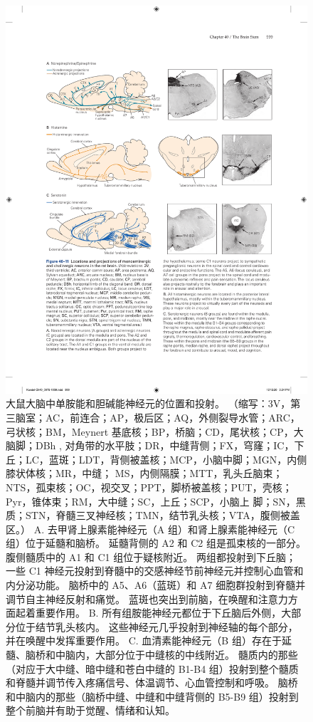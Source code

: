 \begin{figure}[htbp]
	\centering
	\includegraphics[width=0.95\linewidth]{chap40/fig_40_11}
	\caption{大鼠大脑中单胺能和胆碱能神经元的位置和投射。 （缩写：3V，第三脑室；AC，前连合；AP，极后区；AQ，外侧裂导水管；ARC，弓状核；BM，Meynert 基底核；BP，桥脑；CD，尾状核；CP，大脑脚；DBh , 对角带的水平肢；DR，中缝背侧；FX，穹窿；IC，下丘；LC，蓝斑；LDT，背侧被盖核；MCP，小脑中脚；MGN，内侧膝状体核；MR，中缝； MS，内侧隔膜；MTT，乳头丘脑束；NTS，孤束核；OC，视交叉；PPT，脚桥被盖核；PUT，壳核；Pyr，锥体束；RM，大中缝；SC，上丘；SCP，小脑上 脚；SN，黑质；STN，脊髓三叉神经核；TMN，结节乳头核；VTA，腹侧被盖区。） A. 去甲肾上腺素能神经元（A 组）和肾上腺素能神经元（C 组）位于延髓和脑桥。 延髓背侧的 A2 和 C2 组是孤束核的一部分。 腹侧髓质中的 A1 和 C1 组位于疑核附近。 两组都投射到下丘脑； 一些 C1 神经元投射到脊髓中的交感神经节前神经元并控制心血管和内分泌功能。 脑桥中的 A5、A6（蓝斑）和 A7 细胞群投射到脊髓并调节自主神经反射和痛觉。 蓝斑也突出到前脑，在唤醒和注意力方面起着重要作用。 B. 所有组胺能神经元都位于下丘脑后外侧，大部分位于结节乳头核内。 这些神经元几乎投射到神经轴的每个部分，并在唤醒中发挥重要作用。 C. 血清素能神经元（B 组）存在于延髓、脑桥和中脑内，大部分位于中缝核的中线附近。 髓质内的那些（对应于大中缝、暗中缝和苍白中缝的 B1-B4 组）投射到整个髓质和脊髓并调节传入疼痛信号、体温调节、心血管控制和呼吸。 脑桥和中脑内的那些（脑桥中缝、中缝和中缝背侧的 B5-B9 组）投射到整个前脑并有助于觉醒、情绪和认知。}
	\label{fig:40_11}
\end{figure}

